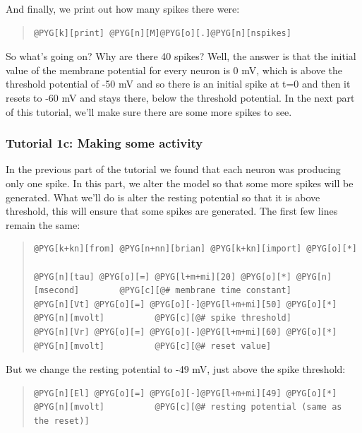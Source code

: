 \documentclass[letterpaper,10pt,english]{manual}
\begin{document}
And finally, we print out how many spikes there were:
\begin{quote}

\begin{Verbatim}[commandchars=@\[\]]
@PYG[k][print] @PYG[n][M]@PYG[o][.]@PYG[n][nspikes]
\end{Verbatim}
\end{quote}

So what's going on? Why are there 40 spikes? Well, the answer is
that the initial value of the membrane potential for every neuron
is 0 mV, which is above the threshold potential of -50 mV and so there
is an initial spike at t=0 and then it resets to -60 mV and stays there,
below the threshold potential. In the next part of this tutorial, we'll
make sure there are some more spikes to see.

\resetcurrentobjects
\hypertarget{--doc-tutorial_1c_making_some_activity}{}

\subsubsection{Tutorial 1c: Making some activity}

In the previous part of the tutorial we found that each neuron
was producing only one spike. In this part, we alter the model so
that some more spikes will be generated. What we'll do is alter
the resting potential  so that it is above threshold, this
will ensure that some spikes are generated. The first few
lines remain the same:
\begin{quote}

\begin{Verbatim}[commandchars=@\[\]]
@PYG[k+kn][from] @PYG[n+nn][brian] @PYG[k+kn][import] @PYG[o][*]

@PYG[n][tau] @PYG[o][=] @PYG[l+m+mi][20] @PYG[o][*] @PYG[n][msecond]        @PYG[c][@# membrane time constant]
@PYG[n][Vt] @PYG[o][=] @PYG[o][-]@PYG[l+m+mi][50] @PYG[o][*] @PYG[n][mvolt]          @PYG[c][@# spike threshold]
@PYG[n][Vr] @PYG[o][=] @PYG[o][-]@PYG[l+m+mi][60] @PYG[o][*] @PYG[n][mvolt]          @PYG[c][@# reset value]
\end{Verbatim}
\end{quote}

But we change the resting potential to -49 mV, just above the
spike threshold:
\begin{quote}

\begin{Verbatim}[commandchars=@\[\]]
@PYG[n][El] @PYG[o][=] @PYG[o][-]@PYG[l+m+mi][49] @PYG[o][*] @PYG[n][mvolt]          @PYG[c][@# resting potential (same as the reset)]
\end{Verbatim}
\end{quote}
\end{document}
